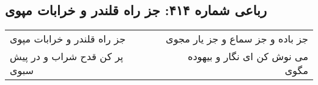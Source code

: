 \begin{center}
\section*{رباعی شماره ۴۱۴: جز راه قلندر و خرابات مپوی}
\label{sec:sh414}
\begin{longtable}{l p{0.5cm} r}
جز راه قلندر و خرابات مپوی
&&
جز باده و جز سماع و جز یار مجوی
\\
پر کن قدح شراب و در پیش سبوی
&&
می نوش کن ای نگار و بیهوده مگوی
\\
\end{longtable}
\end{center}
